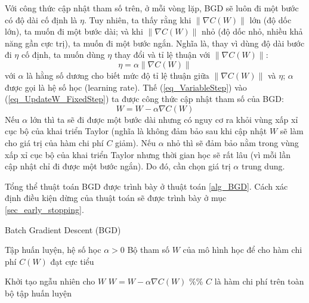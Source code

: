 Với công thức cập nhật tham số trên, ở mỗi vòng lặp, BGD sẽ luôn đi một bước có độ dài cố định là $\eta$. Tuy nhiên, ta thấy rằng khi $\|\nabla C(W)\|$ lớn (độ dốc lớn), ta muốn đi một bước dài; và khi $\|\nabla C(W)\|$ nhỏ (độ dốc nhỏ, nhiều khả năng gần cực trị), ta muốn đi một bước ngắn. Nghĩa là, thay vì dùng độ dài bước đi $\eta$ cố định, ta muốn dùng $\eta$ thay đổi và tỉ lệ thuận với $\|\nabla C(W)\|$:
\begin{equation}
	\eta = \alpha \|\nabla C(W)\|
	\label{eq_VariableStep}
\end{equation}
với $\alpha$ là hằng số dương cho biết mức độ tỉ lệ thuận giữa $\|\nabla C(W)\|$ và $\eta$; $\alpha$ được gọi là hệ số học (learning rate). Thế (\ref{eq_VariableStep}) vào (\ref{eq_UpdateW_FixedStep}) ta được công thức cập nhật tham số của BGD:
\begin{equation}
	W = W - \alpha \nabla C(W)
	\label{eq_UpdateW_VariabeStep}
\end{equation}
Nếu $\alpha$ lớn thì ta sẽ đi được một bước dài nhưng có nguy cơ ra khỏi vùng xấp xỉ cục bộ của khai triển Taylor (nghĩa là không đảm bảo sau khi cập nhật $W$ sẽ làm cho giá trị của hàm chi phí $C$ giảm). Nếu $\alpha$ nhỏ thì sẽ đảm bảo nằm trong vùng xấp xỉ cục bộ của khai triển Taylor nhưng thời gian học sẽ rất lâu (vì mỗi lần cập nhật chỉ đi được một bước ngắn). Do đó, cần chọn giá trị $\alpha$ trung dung.


Tổng thể thuật toán BGD được trình bày ở thuật toán \ref{alg_BGD}. Cách xác định điều kiện dừng của thuật toán sẽ được trình bày ở mục \ref{sec_early_stopping}.
\begin{algorithm}
	\caption{Batch Gradient Descent (BGD)}
	\label{alg_BGD}
	\begin{algorithmic}[1]
		\renewcommand{\algorithmicrequire}{\textbf{Đầu vào:}}
		\renewcommand{\algorithmicensure}{\textbf{Đầu ra:}}
		\algnewcommand{}
		\algnewcommand\Operation{\item[\algorithmicoperation]}
		
		\Require Tập huấn luyện, hệ số học $\alpha>0$
		\Ensure Bộ tham số $W$ của mô hình học để cho hàm chi phí $C(W)$ đạt cực tiểu
		
		\Operation
		\State Khởi tạo ngẫu nhiên cho $W$
			\State $W = W - \alpha \nabla C(W)$ \%\% $C$ là hàm chi phí trên toàn bộ tập huấn luyện
		\EndWhile
	\end{algorithmic}
\end{algorithm}

